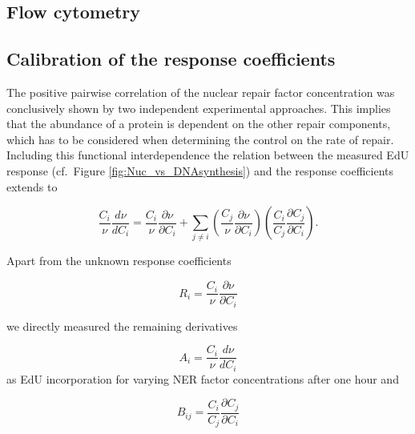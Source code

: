 
\subsection{Flow cytometry}

\subsection{Calibration of the response coefficients}
The positive pairwise correlation of the nuclear repair factor concentration was conclusively shown by two independent experimental approaches. This implies that the abundance of a protein is dependent on the other repair components, which has to be considered when determining the control on the rate of repair. Including this functional interdependence the relation between the measured EdU response (cf.\ Figure \ref{fig:Nuc_vs_DNAsynthesis}) and the response coefficients extends to 

\begin{equation}
 \frac{C_i}{\nu}\frac{d \nu}{d C_i} = \frac{C_i}{\nu}\frac{\partial \nu}{\partial C_i} + \sum_{j \neq i} \left( \frac{C_j}{\nu}\frac{\partial \nu}{\partial C_i}\right) \left(\frac{C_i}{C_j}\frac{\partial C_j}{\partial C_i}\right). 
\end{equation}    

Apart from the unknown response coefficients

\begin{equation}
	R_i = \frac{C_i}{\nu}\frac{\partial \nu}{\partial C_i} \nonumber
\end{equation}

we directly measured the remaining derivatives 

\begin{equation}
A_i = \frac{C_i}{\nu}\frac{d \nu}{d C_i} \nonumber
\end{equation}
as EdU incorporation for varying NER factor concentrations after one hour and

\begin{equation}
B_{ij} = \frac{C_i}{C_j}\frac{\partial C_j}{\partial C_i} \nonumber
\end{equation}

